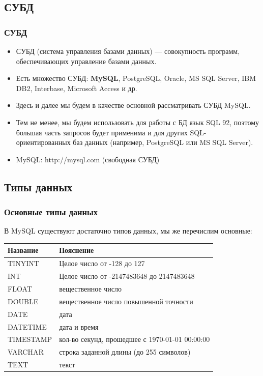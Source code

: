 \documentclass[compress,red]{beamer}
\begin{document}
\subsection{СУБД}
\begin{frame}[fragile]
  \frametitle{СУБД}
  \begin{itemize}
    \item СУБД (система управления базами данных) --- совокупность программ, обеспечивающих управление базами данных.
    \item Есть множество СУБД: \textbf{MySQL}, PostgreSQL, Oracle, MS SQL Server, IBM DB2, Interbase, Microsoft Access и др.
    \item Здесь и далее мы будем в качестве основной рассматривать СУБД MySQL. 
    \item Тем не менее, мы будем использовать для работы с БД язык SQL 92, поэтому большая часть запросов будет применима и для других SQL-ориентированных баз данных (например, PostgreSQL или MS SQL Server).
    \item MySQL: http://mysql.com (свободная СУБД)
  \end{itemize}
\end{frame}

\subsection{Типы данных}
\begin{frame}[fragile]
  \frametitle{Основные типы данных}
  В MySQL существуют достаточно типов данных, мы же перечислим основные:
  \begin{tabular}{|l|l|}
  \hline
  Название & Пояснение\\
  \hline
  TINYINT & Целое число от -128 до 127\\
  \hline
  INT & Целое число от -2147483648 до 2147483648\\
  \hline
  FLOAT & вещественное число\\
  \hline
  DOUBLE & вещественное число повышенной точности\\
  \hline
  DATE & дата\\
  \hline
  DATETIME & дата и время\\
  \hline
  TIMESTAMP & кол-во секунд, прошедшее с 1970-01-01 00:00:00\\
  \hline
  VARCHAR & строка заданной длины (до 255 символов)\\
  \hline
  TEXT & текст\\
  \hline
  \end{tabular}
\end{frame}
\end{document}
